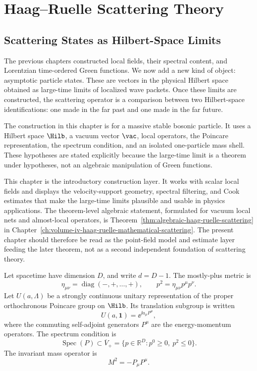 \chapter{Haag--Ruelle Scattering Theory}
\label{ch:haag-ruelle}
\ConventionsLorentzian


\section{Scattering States as Hilbert-Space Limits}

The previous chapters constructed local fields, their spectral content, and
Lorentzian time-ordered Green functions. We now add a new kind of object:
asymptotic particle states. These are vectors in the physical Hilbert space
obtained as large-time limits of localized wave packets. Once these limits are
constructed, the scattering operator is a comparison between two Hilbert-space
identifications: one made in the far past and one made in the far future.

The construction in this chapter is for a massive stable bosonic particle. It
uses a Hilbert space \(\Hilb\), a vacuum vector \(\vac\), local operators, the
Poincare representation, the spectrum condition, and an isolated
one-particle mass shell. These hypotheses are stated explicitly because the
large-time limit is a theorem under hypotheses, not an algebraic manipulation
of Green functions.

This chapter is the introductory construction layer.  It works with scalar
local fields and displays the velocity-support geometry, spectral filtering,
and Cook estimates that make the large-time limits plausible and usable in
physics applications.  The theorem-level algebraic statement, formulated for
vacuum local nets and almost-local operators, is
Theorem~\ref{thm:algebraic-haag-ruelle-scattering} in
Chapter~\ref{ch:volume-iv-haag-ruelle-mathematical-scattering}.  The present
chapter should therefore be read as the point-field model and estimate layer
feeding the later theorem, not as a second independent foundation of
scattering theory.

Let spacetime have dimension \(D\), and write \(d=D-1\). The mostly-plus
metric is
\[
  \eta_{\mu\nu}=\operatorname{diag}(-,+,\ldots,+),
  \qquad
  p^2=\eta_{\mu\nu}p^\mu p^\nu .
\]
Let \(U(a,\Lambda)\) be a strongly continuous unitary representation of the
proper orthochronous Poincare group on \(\Hilb\). Its translation subgroup is
written
\[
  U(a,\mathbf 1)=\ee^{\ii a_\mu P^\mu},
\]
where the commuting self-adjoint generators \(P^\mu\) are the
energy-momentum operators. The spectrum condition is
\[
  \operatorname{Spec}(P)\subset \overline V_+
  =
  \{p\in\mathbb R^D:p^0\ge 0,\ p^2\le 0\}.
\]
The invariant mass operator is
\[
  M^2=-P_\mu P^\mu .
\]

